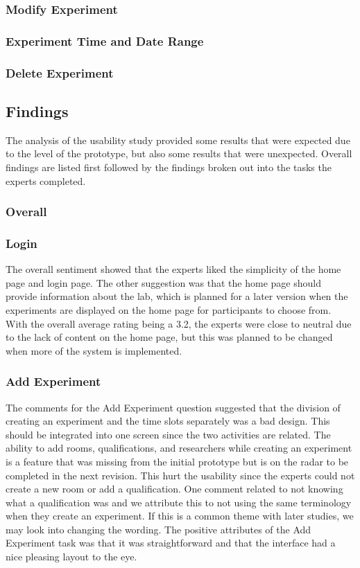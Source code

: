 \subsubsection{Modify Experiment}

\subsubsection{Experiment Time and Date Range}

\subsubsection{Delete Experiment}


\subsection{Findings}
The analysis of the usability study provided some results that were expected due to the level of the prototype, but also some results that were unexpected. Overall findings are listed first followed by the findings broken out into the tasks the experts completed.

\subsubsection{Overall}


\subsubsection{Login}
The overall sentiment showed that the experts liked the simplicity of the home page and login page. The other suggestion was that the home page should provide information about the lab, which is planned for a later version when the experiments are displayed on the home page for participants to choose from. With the overall average rating being a 3.2, the experts were close to neutral due to the lack of content on the home page, but this was planned to be changed when more of the system is implemented.

\subsubsection{Add Experiment}
The comments for the Add Experiment question suggested that the division of creating an experiment and the time slots separately was a bad design. This should be integrated into one screen since the two activities are related. The ability to add rooms, qualifications, and researchers while creating an experiment is a feature that was missing from the initial prototype but is on the radar to be completed in the next revision. This hurt the usability since the experts could not create a new room or add a qualification. One comment related to not knowing what a qualification was and we attribute this to not using the same terminology when they create an experiment. If this is a common theme with later studies, we may look into changing the wording. The positive attributes of the Add Experiment task was that it was straightforward and that the interface had a nice pleasing layout to the eye.

